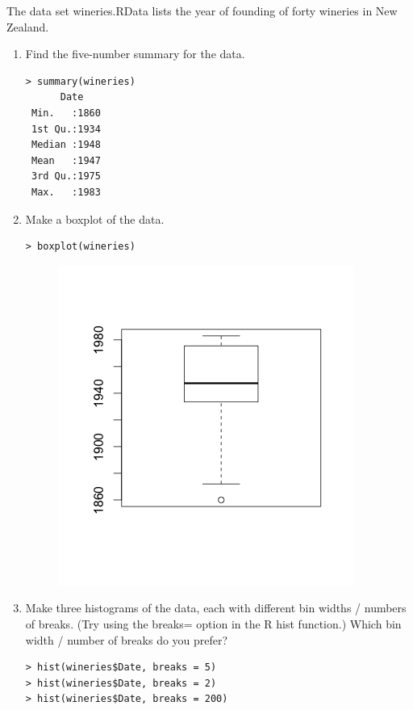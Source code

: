 \documentclass[12pt]{article}
\newenvironment{question}[2][Question]{\begin{trivlist}
\item[\hskip \labelsep {\bfseries #1}\hskip \labelsep {\bfseries #2.}]}{\end{trivlist}}
\begin{document}
\begin{question}{3}
The data set wineries.RData lists the year of founding of forty wineries in New Zealand.
\end{question}

\begin{enumerate}[label=(\alph*)]
\item Find the five-number summary for the data.
\begin{lstlisting}
> summary(wineries)
      Date     
 Min.   :1860  
 1st Qu.:1934  
 Median :1948  
 Mean   :1947  
 3rd Qu.:1975  
 Max.   :1983 
\end{lstlisting}

\item Make a boxplot of the data.
\begin{lstlisting}
> boxplot(wineries)
\end{lstlisting}

\begin{figure}[h!]
\centering
\includegraphics[scale=.8]{boxPlotWineries.png}
\end{figure}

\item Make three histograms of the data, each with different bin widths / numbers of breaks. (Try using the breaks= option in the R hist function.) Which bin width / number of breaks do you prefer?
\begin{lstlisting}
> hist(wineries$Date, breaks = 5)
> hist(wineries$Date, breaks = 2)
> hist(wineries$Date, breaks = 200)
\end{lstlisting}


\end{enumerate}
\end{document}
